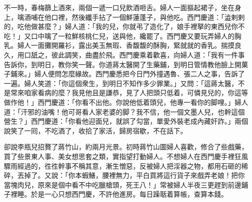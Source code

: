 不一時，春梅篩上酒來，兩個一遞一口兒飲酒咂舌。婦人一面摳起裙子，坐在身上，噙酒哺在他口裡，然後纖手拈了一個鮮蓮蓬子，{}與他吃。西門慶道：「澁剌剌的，{}吃他做甚麼？」婦人道：「我的兒，你就弔了造化了，娘手裡拏的東西兒你不吃！」又口中噙了一粒鮮核桃仁兒，{}送與他，纔罷了。西門慶又要玩弄婦人的胸乳。婦人一面攤開羅衫，露出美玉無瑕、香馥馥的酥胸，緊就就的香乳。揣摸良久，用口舐之，彼此調笑，曲盡於飛。西門慶乘着歡喜，向婦人道：「我有一件事告訴你，到明日，教你笑一聲。你道蔣太醫開了生藥鋪，到明日管情教他臉上開菓子鋪來。」婦人便問怎麼緣故。西門慶悉把今日門外撞遇魯、張二人之事，告訴了一遍。婦人笑道：「你這個衆生，到明日不知作多少罪業。」又問：「這蔣太醫，不是常來咱家看病的麼？我見他且是謙恭，見了人把頭只低着，可憐見兒的，你這等做作他！」西門慶道：「你看不出他。你說他低着頭兒，他專一看你的脚哩。」婦人道：「汗邪的油嘴！他可哥看人家老婆的脚？我不信，他一個文墨人兒，{}也幹這個營生？」{}西門慶道：「你看他迎面兒，就誤了勾當，單愛外裝老成內藏奸詐。」兩個說笑了一囘，不吃酒了，收拾了家活，歸房宿歇，不在話下。

卻說李瓶兒招贅了蔣竹山，約兩月光景。初時蔣竹山圖婦人喜歡，修合了些戲藥，買了些景東人事、美女想思套之類，實指望打動婦人。不想婦人在西門慶手裡狂風驟雨經過的，徃徃幹事不稱其意，漸生憎惡，反被婦人把淫器之物，都用石砸的稀碎，丟掉了。{}又說：「你本蝦鱔，腰裡無力，{}平白買將這行貨子來戲弄老娘！把你當塊肉兒，原來是個中看不中吃臘槍頭，死王八！」常被婦人半夜三更趕到前邊鋪子裡睡。於是一心只想西門慶，不許他進房。每日躁聒着算帳，查算本錢。

